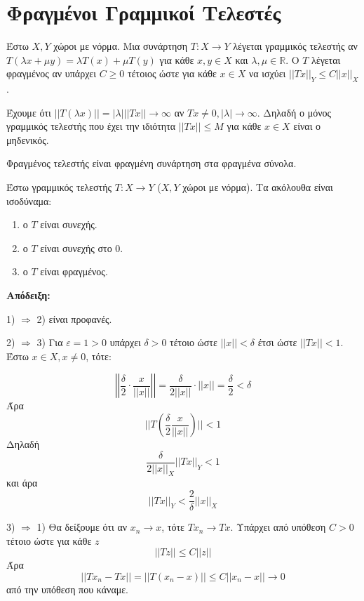 \pagebreak

\section{Φραγμένοι Γραμμικοί Τελεστές}


Έστω $X,Y$ χώροι με νόρμα. Μια συνάρτηση $T: X \rightarrow Y$ λέγεται γραμμικός τελεστής αν $T(\lambda x + \mu y) = \lambda T(x) + \mu T(y)$ για κάθε $x,y \in X$ και $\lambda,\mu \in \mathbb R$. Ο $T$ λέγεται φραγμένος αν υπάρχει $C \geq 0$ τέτοιος ώστε για κάθε $x  \in X$ να ισχύει $||Tx||_Y \leq C ||x||_X$.


Έχουμε ότι $||T(\lambda x) || = |\lambda| ||Tx|| \rightarrow \infty$ αν $Tx \neq 0, |\lambda|\rightarrow \infty$. Δηλαδή ο μόνος γραμμικός τελεστής που έχει την ιδιότητα $||Tx|| \leq M$ για κάθε $x \in X$ είναι ο μηδενικός.


Φραγμένος τελεστής είναι φραγμένη συνάρτηση στα φραγμένα σύνολα.

\begin{protash}
    Έστω γραμμικός τελεστής $T: X \rightarrow Y$ ($X,Y$ χώροι με νόρμα). Τα ακόλουθα είναι ισοδύναμα:
    \begin{enumerate}
    \item ο $T$ είναι συνεχής.
    \item ο $T$ είναι συνεχής στο $0$.
    \item ο $T$ είναι φραγμένος.
    \end{enumerate}
\end{protash}

\textbf{Απόδειξη:} $ $

    
    1) $\Rightarrow$ 2) είναι προφανές.

    
    2) $\Rightarrow$ 3) Για $\varepsilon = 1 >0$ υπάρχει $\delta >0$ τέτοιο ώστε $||x||< \delta$ έτσι ώστε $||Tx|| <1$. Έστω $x \in X, x\neq 0$, τότε:

    $$\left|\left| \frac{\delta}{2} \cdot \frac{x}{||x||} \right|\right| = \frac{\delta}{2||x||} \cdot ||x|| = \frac{\delta}{2} < \delta$$ Άρα 
    $$|| T(\frac{\delta}{2} \frac{x}{||x||})|| <1$$ Δηλαδή $$\frac{\delta}{2 ||x||_X} ||Tx||_Y <1$$ και άρα 
    $$||Tx||_Y < \frac{2}{\delta} ||x||_X$$

    
    3) $\Rightarrow$ 1) Θα δείξουμε ότι αν $x_n \rightarrow x$, τότε $Tx_n \rightarrow Tx$. Υπάρχει από υπόθεση $C>0$ τέτοιο ώστε για κάθε $z$
    $$|| Tz || \leq C ||z||$$ Άρα 
    $$||Tx_n - Tx|| = ||T(x_n - x)|| \leq C ||x_n - x|| \rightarrow 0$$ από την υπόθεση που κάναμε.

